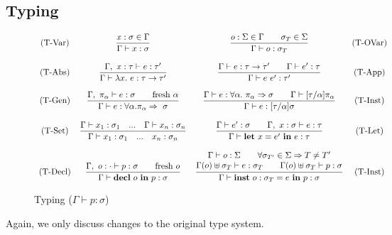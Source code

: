 \documentclass[runningheads]{llncs}
\begin{document}
\subsection{Typing}
\begin{figure}$$
  \begin{array}{c c c c} 
    \text{(T-Var)}
    &
    \displaystyle
    \frac{x: \sigma  \in \Gamma}
         {\Gamma \vdash x: \sigma }
    &
    \displaystyle
    \frac{o: \Sigma  \in \Gamma \quad \quad \sigma_T \in \Sigma}
    {\Gamma \vdash o: \sigma_T }
    &
    \text{(T-OVar)}
    \\\\
    \text{(T-Abs)}
    &
    \displaystyle
    \frac{\Gamma,\ x:\tau \vdash e : \tau^\prime}
         {\Gamma \vdash \lambda x. \ e : \tau \rightarrow \tau^\prime}
    &
    
    \displaystyle
    \frac{\Gamma \vdash e : \tau \rightarrow \tau^\prime \quad\quad \Gamma \vdash e^\prime : \tau}
         {\Gamma \vdash e \ e^\prime : \tau^\prime}
    &
    \text{(T-App)}
    \\\\
    \text{(T-Gen)}
    &
    \displaystyle
    \frac{\Gamma, \ \pi_\alpha\vdash e:\sigma \quad \quad \text{fresh }\alpha}
         {\Gamma \vdash e : \forall \alpha. \pi_\alpha \Rightarrow \ \sigma}
    &
    \displaystyle
    \frac{\Gamma \vdash e: \forall \alpha. \ \pi_\alpha \Rightarrow \sigma \quad \quad \Gamma \vdash [\tau/\alpha]\pi_\alpha}
         {\Gamma \vdash e:[\tau/\alpha]\sigma}
    &
    \text{(T-Inst)}
    \\\\
    \text{(T-Set)}
    &
    \displaystyle
    \frac{\Gamma \vdash x_1:\sigma_1  \quad ...\quad \Gamma \vdash x_n:\sigma_n}
         {\Gamma \vdash x_1:\sigma_1 \quad ...\quad x_n:\sigma_n}
    &
    \displaystyle
    \frac{\Gamma \vdash e^\prime : \sigma \quad \quad \Gamma,\ x:\sigma \vdash e : \tau}
         {\Gamma \vdash \textbf{let} \ x = e^\prime \ \textbf{in} \ e : \tau}
    &
    \text{(T-Let)}
    \\\\
    \text{(T-Decl)}
    &
    \displaystyle
    \frac{\Gamma, \ o: \cdot  \vdash p : \sigma \quad\quad \text{fresh} \ o}
         {\Gamma \vdash \textbf{decl} \ o \ \textbf{in} \ p : \sigma}
    &
    \displaystyle
    \frac{ \begin{matrix}
        \Gamma \vdash o : \Sigma \quad \quad  \forall \sigma_{T^\prime} \in \Sigma \Rightarrow T \neq T^\prime \\
        \Gamma(o) \uplus \sigma_T %
        \vdash e : \sigma_T \quad \quad  \Gamma(o) \uplus \sigma_T \vdash p: \sigma
    \end{matrix}}
    {\Gamma \vdash \textbf{inst} \ o :  \sigma_T  = e \ \textbf{in} \ p : \sigma} 
    &
    \text{(T-Inst)}
  \end{array}$$
  \caption{Typing ($\Gamma \vdash p : \sigma$)}
\end{figure}
\noindent Again, we only discuss changes to the original type system. 
\end{document}
